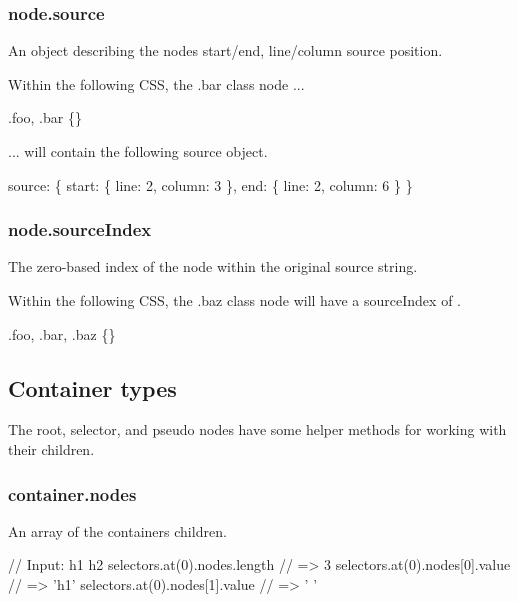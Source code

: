 \subsubsection*{{\ttfamily node.\+source}}

An object describing the node\textquotesingle{}s start/end, line/column source position.

Within the following C\+SS, the {\ttfamily .bar} class node ...


\begin{DoxyCode}
.foo,
  .bar \{\}
\end{DoxyCode}


... will contain the following {\ttfamily source} object.


\begin{DoxyCode}
source: \{
    start: \{
        line: 2,
        column: 3
    \},
    end: \{
        line: 2,
        column: 6
    \}
\}
\end{DoxyCode}


\subsubsection*{{\ttfamily node.\+source\+Index}}

The zero-\/based index of the node within the original source string.

Within the following C\+SS, the {\ttfamily .baz} class node will have a {\ttfamily source\+Index} of {}.


\begin{DoxyCode}
.foo, .bar, .baz \{\}
\end{DoxyCode}


\subsection*{Container types}

The {\ttfamily root}, {\ttfamily selector}, and {\ttfamily pseudo} nodes have some helper methods for working with their children.

\subsubsection*{{\ttfamily container.\+nodes}}

An array of the container\textquotesingle{}s children.


\begin{DoxyCode}
// Input: h1 h2
selectors.at(0).nodes.length   // => 3
selectors.at(0).nodes[0].value // => 'h1'
selectors.at(0).nodes[1].value // => ' '
\end{DoxyCode}


